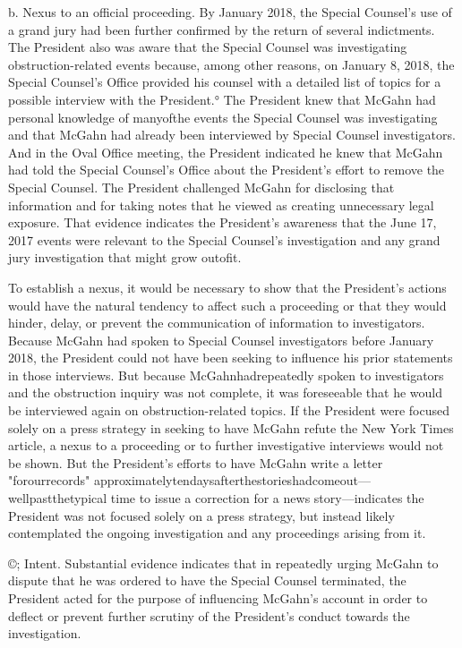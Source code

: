b. Nexus to an official proceeding.
By January 2018, the Special Counsel's use of a grand jury had been further confirmed by the return of several indictments.
The President also was aware that the Special Counsel was investigating obstruction-related events because, among other reasons, on January 8, 2018, the Special Counsel's Office provided his counsel with a detailed list of topics for a possible interview with the President.°
The President knew that McGahn had personal knowledge of manyofthe events the Special Counsel was investigating and that McGahn had already been interviewed by Special Counsel investigators.
And in the Oval Office meeting, the President indicated he knew that McGahn had told the Special Counsel's Office about the President's effort to remove the Special Counsel.
The President challenged McGahn for disclosing that information and for taking notes that he viewed as creating unnecessary legal exposure.
That evidence indicates the President's awareness that the June 17, 2017 events were relevant to the Special Counsel's investigation and any grand jury investigation that might grow outofit.

To establish a nexus, it would be necessary to show that the President's actions would have the natural tendency to affect such a proceeding or that they would hinder, delay, or prevent the communication of information to investigators.
Because McGahn had spoken to Special Counsel investigators before January 2018, the President could not have been seeking to influence his prior statements in those interviews.
But because McGahnhadrepeatedly spoken to investigators and the obstruction inquiry was not complete, it was foreseeable that he would be interviewed again on obstruction-related topics.
If the President were focused solely on a press strategy in seeking to have McGahn refute the New York Times article, a nexus to a proceeding or to further investigative interviews would not be shown.
But the President's efforts to have McGahn write a letter "forourrecords" approximatelytendaysafterthestorieshadcomeout—wellpastthetypical time to issue a correction for a news story—indicates the President was not focused solely on a press strategy, but instead likely contemplated the ongoing investigation and any proceedings arising from it.

©; Intent.
Substantial evidence indicates that in repeatedly urging McGahn to dispute that he was ordered to have the Special Counsel terminated, the President acted for the purpose of influencing McGahn's account in order to deflect or prevent further scrutiny of the President's conduct towards the investigation.

